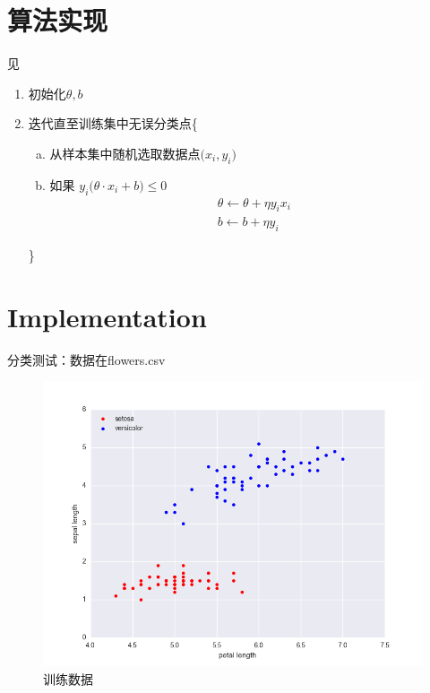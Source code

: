 \documentclass{ctexart}
\begin{document}

\section{算法实现}
见\cite{LiHang:Statistic}
%
\begin{enumerate}[1.]
\item 初始化$\theta,b$
\item 迭代直至训练集中无误分类点\{
\begin{enumerate}[a.]
\item 从样本集中随机选取数据点$\big(x_i,y_i\big)$
\item 如果 $y_i\big(\theta\cdot x_i+b\big)\leq0$
\begin{equation}
\begin{array}{lcl}
\theta \leftarrow \theta+\eta y_ix_i\\
b\leftarrow b+ \eta y_i
\end{array}
\end{equation}
\end{enumerate}
\}
\end{enumerate}

%
\section{Implementation}
分类测试：数据在flowers.csv
\begin{figure}[H]
\begin{center}
\includegraphics[width=1\textwidth]{fig/raw.png} %
\caption{训练数据}
\end{center}
\end{figure}
\end{document}
